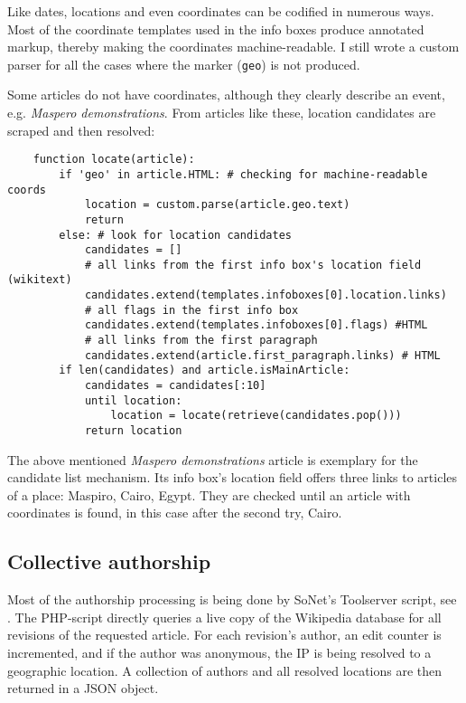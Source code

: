 Like dates, locations and even coordinates can be codified in numerous ways. 
Most of the coordinate templates used in the info boxes produce annotated markup, thereby making the coordinates machine-readable.
I still wrote a custom parser for all the cases where the marker (\verb"geo") is not produced.

Some articles do not have coordinates, although they clearly describe an event, e.g. \emph{Maspero demonstrations}.
From articles like these, location candidates are scraped and then resolved:

\begin{lstlisting}
	function locate(article):
		if 'geo' in article.HTML: # checking for machine-readable coords
			location = custom.parse(article.geo.text)
			return
		else: # look for location candidates
			candidates = []
			# all links from the first info box's location field (wikitext)
			candidates.extend(templates.infoboxes[0].location.links)
			# all flags in the first info box 
			candidates.extend(templates.infoboxes[0].flags) #HTML
			# all links from the first paragraph
			candidates.extend(article.first_paragraph.links) # HTML
		if len(candidates) and article.isMainArticle:
			candidates = candidates[:10]
			until location:
				location = locate(retrieve(candidates.pop()))
			return location
\end{lstlisting}

The above mentioned \emph{Maspero demonstrations} article is exemplary for the candidate list mechanism.
Its info box's location field offers three links to articles of a place: Maspiro, Cairo, Egypt.
They are checked until an article with coordinates is found, in this case after the second try, Cairo.

\subsection{Collective authorship}\label{sub:authorshipalgorithm}

Most of the authorship processing is being done by SoNet's Toolserver script, see .
The \ac{PHP}-script directly queries a live copy of the Wikipedia database for all revisions of the requested article.
For each revision's author, an edit counter is incremented, and if the author was anonymous, the \ac{IP} is being resolved to a geographic location.
A collection of authors and all resolved locations are then returned in a \ac{JSON} object. 


